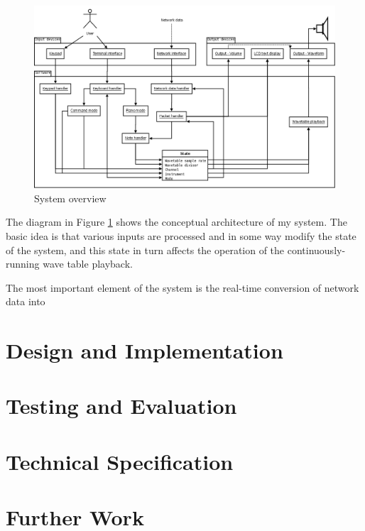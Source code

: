 \documentclass[a4paper,10pt]{article}
\begin{document}
\begin{figure}[!htbp]
\centering
\includegraphics[totalheight=0.55\textheight,angle=90]{images/overview.png}
\caption{System overview}\label{fig:systemoverview}
\end{figure}

The diagram in Figure \ref{fig:systemoverview} shows the conceptual architecture of my system.  The 
basic idea is that various inputs are processed and in some way modify the state of the system, and 
this state in turn affects the operation of the continuously-running wave table playback.

The most important element of the system is the real-time conversion of network data into

\pagebreak
\section{Design and Implementation}

\pagebreak
\section{Testing and Evaluation}

\pagebreak
\section{Technical Specification}

\pagebreak
\section{Further Work}


\appendix

\pagebreak
\begin{thebibliography}{99}
\end{thebibliography}
\end{document}
